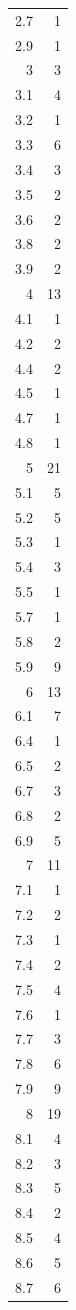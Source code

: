 \documentclass[
]{article}
\begin{document}
\begin{figure}
\begin{minipage}{0.50\linewidth}
\begin{longtable}[]{@{}rr@{}}
2.7 & 1 \\
2.9 & 1 \\
3 & 3 \\
3.1 & 4 \\
3.2 & 1 \\
3.3 & 6 \\
3.4 & 3 \\
3.5 & 2 \\
3.6 & 2 \\
3.8 & 2 \\
3.9 & 2 \\
4 & 13 \\
4.1 & 1 \\
4.2 & 2 \\
4.4 & 2 \\
4.5 & 1 \\
4.7 & 1 \\
4.8 & 1 \\
5 & 21 \\
5.1 & 5 \\
5.2 & 5 \\
5.3 & 1 \\
5.4 & 3 \\
5.5 & 1 \\
5.7 & 1 \\
5.8 & 2 \\
5.9 & 9 \\
6 & 13 \\
6.1 & 7 \\
6.4 & 1 \\
6.5 & 2 \\
6.7 & 3 \\
6.8 & 2 \\
6.9 & 5 \\
7 & 11 \\
7.1 & 1 \\
7.2 & 2 \\
7.3 & 1 \\
7.4 & 2 \\
7.5 & 4 \\
7.6 & 1 \\
7.7 & 3 \\
7.8 & 6 \\
7.9 & 9 \\
8 & 19 \\
8.1 & 4 \\
8.2 & 3 \\
8.3 & 5 \\
8.4 & 2 \\
8.5 & 4 \\
8.6 & 5 \\
8.7 & 6 \\

\end{longtable}
\end{minipage}
\end{figure}
\end{document}
